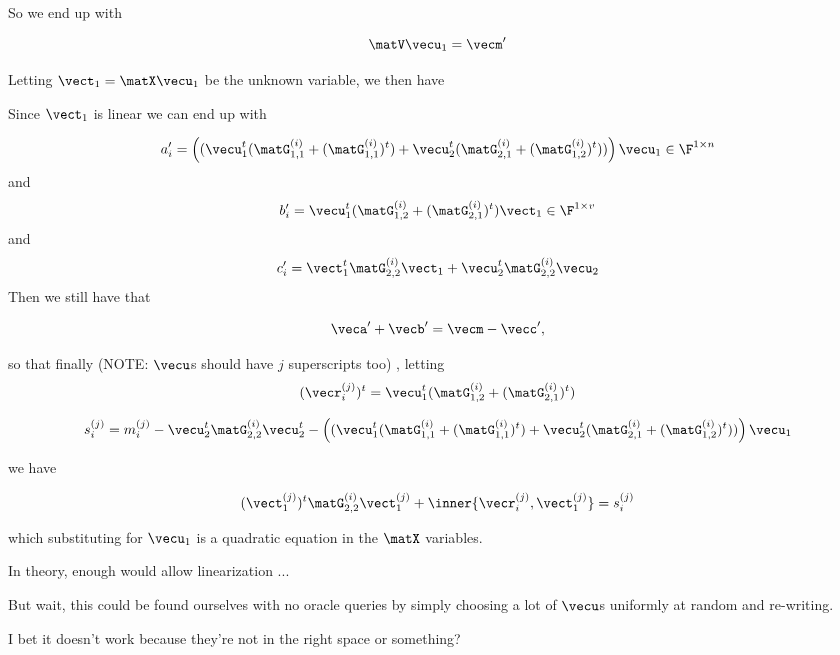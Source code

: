 So we end up with

\begin{equation}\label{eq:secondnew}
\matV\vecu_1 = \vecm'
\end{equation}

Letting $\vect_1=\matX\vecu_1$ be the unknown variable, we then have 

Since $\vect_1$ is linear 
we can end up with 

\[a_i' =
\left((\vecu_1^t(\matG_{1,1}^{(i)}+(\matG_{1,1}^{(i)})^t)+\vecu_2^t(\matG_{2,1}^{(i)}+(\matG_{1,2}^{(i)})^t))\right)\vecu_1
\in \F^{1 \times n}\]
and
\[b'_i=\vecu_1^t(\matG_{1,2}^{(i)}+(\matG_{2,1}^{(i)})^t)\vect_1
\in \F^{1 \times v}\] 
and 
\[c'_i=\vect_1^t\matG_{2,2}^{(i)}\vect_1+\vecu_2^t\matG_{2,2}^{(i)}\vecu_2\]
Then we still have that 

\[\veca'+\vecb' = \vecm - \vecc',\]

so that finally (NOTE: $\vecu$s should have $j$ superscripts too) , letting 
\[(\vecr^{(j)}_i)^t=\vecu_1^t(\matG_{1,2}^{(i)}+(\matG_{2,1}^{(i)})^t)\]

\[s^{(j)}_i=m^{(j)}_i-\vecu_2^{t}\matG_{2,2}^{(i)}\vecu_2^{t}-\left((\vecu_1^t(\matG_{1,1}^{(i)}+(\matG_{1,1}^{(i)})^t)+\vecu_2^t(\matG_{2,1}^{(i)}+(\matG_{1,2}^{(i)})^t))\right)\vecu_1
\]


we have 

\[(\vect^{(j)}_1)^{t}\matG_{2,2}^{(i)}\vect^{(j)}_1+\inner{\vecr^{(j)}_i,\vect_1^{(j)}}=s^{(j)}_i\]

which substituting for $\vecu_1$ is a quadratic equation in the
$\matX$ variables. 

In theory, enough would allow linearization ...

But wait, this could be found ourselves with no oracle queries by
simply choosing a lot of $\vecu$s uniformly at random and re-writing. 

I bet it doesn't work because they're not in the right space or
something? 



